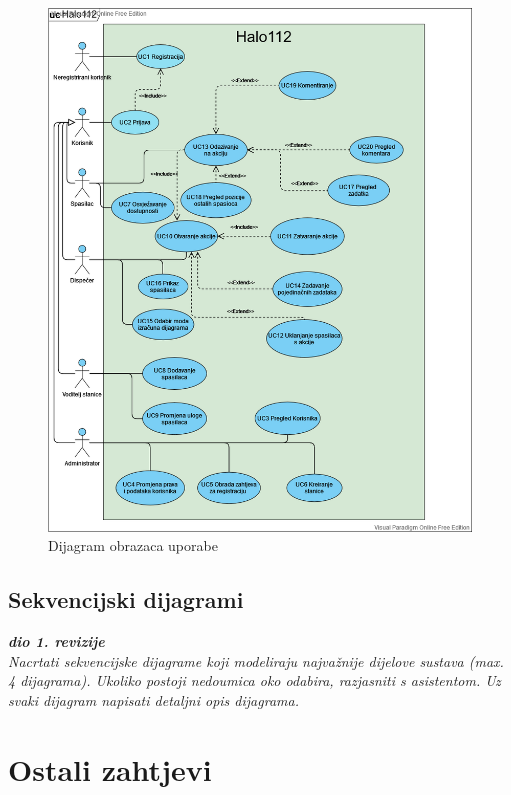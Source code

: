 				\begin{figure}[H]
					\includegraphics[scale=0.5]{slike/usecase.PNG} %
					\centering
					\caption{Dijagram obrazaca uporabe}
					\label{fig:promjene}
				\end{figure}
				\eject		
				
			\subsection{Sekvencijski dijagrami}
				
				\textbf{\textit{dio 1. revizije}}\\
				
				\textit{Nacrtati sekvencijske dijagrame koji modeliraju najvažnije dijelove sustava (max. 4 dijagrama). Ukoliko postoji nedoumica oko odabira, razjasniti s asistentom. Uz svaki dijagram napisati detaljni opis dijagrama.}
			
				\eject
	
		\section{Ostali zahtjevi}
		
